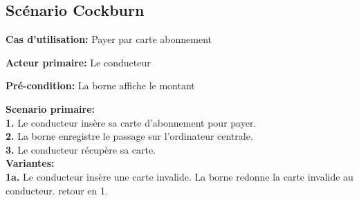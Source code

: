 \subsection{Scénario Cockburn}
\textbf{Cas d'utilisation:} Payer par carte abonnement

\textbf{Acteur primaire:} Le conducteur

\textbf{Pré-condition: }  La borne affiche le montant

 

\textbf{Scenario primaire: } \\
    \textbf{1.} Le conducteur insère sa carte d’abonnement pour payer. \\
    \textbf{2.} La borne enregistre le passage sur l’ordinateur centrale.\\
    \textbf{3.} Le conducteur récupère sa carte.\\

\textbf{Variantes:}\\
    \textbf{1a.}  Le conducteur insère une carte invalide. La borne redonne la carte invalide au conducteur. retour en 1.\\
    
\newpage
